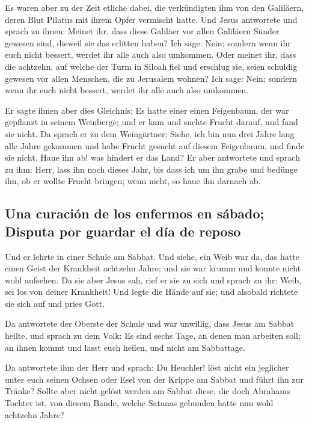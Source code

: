  Es waren aber zu der Zeit etliche dabei, die verkündigten
ihm von den Galiläern, deren Blut Pilatus mit ihrem Opfer vermischt
hatte.  Und Jesus antwortete und sprach zu ihnen: Meinet
ihr, dass diese Galiläer vor allen Galiläern Sünder gewesen sind,
dieweil sie das erlitten haben?  Ich sage: Nein; sondern
wenn ihr euch nicht bessert, werdet ihr alle auch also umkommen.
 Oder meinet ihr, dass die achtzehn, auf welche der Turm
in Siloah fiel und erschlug sie, seien schuldig gewesen vor allen
Menschen, die zu Jerusalem wohnen?  Ich sage: Nein;
sondern wenn ihr euch nicht bessert, werdet ihr alle auch also umkommen.

 Er sagte ihnen aber dies Gleichnis: Es hatte einer einen
Feigenbaum, der war gepflanzt in seinem Weinberge; und er kam und suchte
Frucht darauf, und fand sie nicht.  Da sprach er zu dem
Weingärtner: Siehe, ich bin nun drei Jahre lang alle Jahre gekommen und
habe Frucht gesucht auf diesem Feigenbaum, und finde sie nicht. Haue ihn
ab! was hindert er das Land?  Er aber antwortete und
sprach zu ihm: Herr, lass ihn noch dieses Jahr, bis dass ich um ihn
grabe und bedünge ihn,  ob er wollte Frucht bringen; wenn
nicht, so haue ihn darnach ab.

\hypertarget{una-curaciuxf3n-de-los-enfermos-en-suxe1bado-disputa-por-guardar-el-duxeda-de-reposo}{%
\subsection{Una curación de los enfermos en sábado; Disputa por guardar
el día de
reposo}\label{una-curaciuxf3n-de-los-enfermos-en-suxe1bado-disputa-por-guardar-el-duxeda-de-reposo}}

 Und er lehrte in einer Schule am Sabbat. 
Und siehe, ein Weib war da, das hatte einen Geist der Krankheit achtzehn
Jahre; und sie war krumm und konnte nicht wohl aufsehen. 
Da sie aber Jesus sah, rief er sie zu sich und sprach zu ihr: Weib, sei
los von deiner Krankheit!  Und legte die Hände auf sie;
und alsobald richtete sie sich auf und pries Gott.

 Da antwortete der Oberste der Schule und war unwillig,
dass Jesus am Sabbat heilte, und sprach zu dem Volk: Es sind sechs Tage,
an denen man arbeiten soll; an ihnen kommt und lasst euch heilen, und
nicht am Sabbattage.

 Da antwortete ihm der Herr und sprach: Du Heuchler! löst
nicht ein jeglicher unter euch seinen Ochsen oder Esel von der Krippe am
Sabbat und führt ihn zur Tränke?  Sollte aber nicht
gelöst werden am Sabbat diese, die doch Abrahams Tochter ist, von diesem
Bande, welche Satanas gebunden hatte nun wohl achtzehn Jahre?

